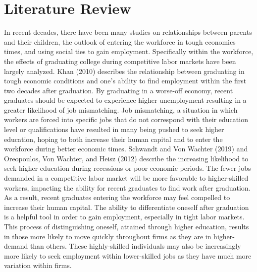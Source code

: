 \documentclass[12pt]{article}
\begin{document}
\section{Literature Review} \label{sec:literature}
In recent decades, there have been many studies on relationships between parents and their children, the outlook of entering the workforce in tough economics times, and using social ties to gain employment. Specifically within the workforce, the effects of graduating college during competitive labor markets have been largely analyzed. Khan (2010) describes the relationship between graduating in tough economic conditions and one's ability to find employment within the first two decades after graduation. By graduating in a worse-off economy, recent graduates should be expected to experience higher unemployment resulting in a greater likelihood of job mismatching. Job mismatching, a situation in which workers are forced into specific jobs that do not correspond with their education level or qualifications have resulted in many being pushed to seek higher education, hoping to both increase their human capital and to enter the workforce during better economic times. Schwandt and Von Wachter (2019) and Oreopoulos, Von Wachter, and Heisz (2012) describe the increasing likelihood to seek higher education during recessions or poor economic periods. The fewer jobs demanded in a competitive labor market will be more favorable to higher-skilled workers, impacting the ability for recent graduates to find work after graduation. As a result, recent graduates entering the workforce may feel compelled to increase their human capital. The ability to differentiate oneself after graduation is a helpful tool in order to gain employment, especially in tight labor markets. This process of distinguishing oneself, attained through higher education, results in those more likely to move quickly throughout firms as they are in higher-demand than others. These highly-skilled individuals  may also be increasingly more likely to seek employment within lower-skilled jobs as they have much more variation within firms. 
\end{document}
